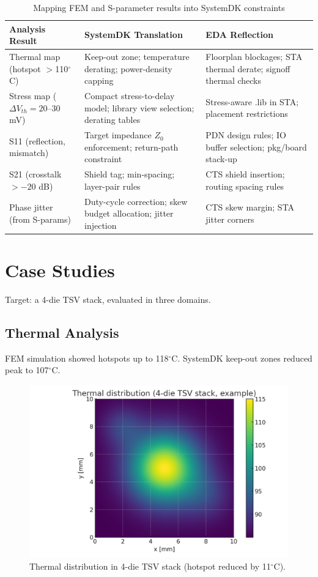 \documentclass[conference]{IEEEtran}
\begin{document}
\begin{table}[t]
\centering
\caption{Mapping FEM and S-parameter results into SystemDK constraints}
\label{tab:mapping}
\setlength{\tabcolsep}{6pt}
\renewcommand{\arraystretch}{1.25}
\footnotesize
\begin{tabularx}{\textwidth}{|p{}|p{}|p{}|}
\hline
\textbf{Analysis Result} & \textbf{SystemDK Translation} & \textbf{EDA Reflection} \\
\hline
Thermal map (hotspot $>$110$^\circ$C) &
Keep-out zone; temperature derating; power-density capping &
Floorplan blockages; STA thermal derate; signoff thermal checks \\
\hline
Stress map ($\Delta V_{th}=20$--30 mV) &
Compact stress-to-delay model; library view selection; derating tables &
Stress-aware .lib in STA; placement restrictions \\
\hline
S11 (reflection, mismatch) &
Target impedance $Z_0$ enforcement; return-path constraint &
PDN design rules; IO buffer selection; pkg/board stack-up \\
\hline
S21 (crosstalk $>-20$ dB) &
Shield tag; min-spacing; layer-pair rules &
CTS shield insertion; routing spacing rules \\
\hline
Phase jitter (from S-params) &
Duty-cycle correction; skew budget allocation; jitter injection &
CTS skew margin; STA jitter corners \\
\hline
\end{tabularx}
\end{table}

\section{Case Studies}
Target: a 4-die TSV stack, evaluated in three domains.

\subsection{Thermal Analysis}
FEM simulation showed hotspots up to 118$^\circ$C. SystemDK keep-out zones reduced peak to 107$^\circ$C.

\begin{figure}[htbp]
  \centering
  \includegraphics[width=0.85\linewidth]{thermal_map}
  \caption{Thermal distribution in 4-die TSV stack (hotspot reduced by 11$^\circ$C).}
  \label{fig:thermal}
\end{figure}
\end{document}
